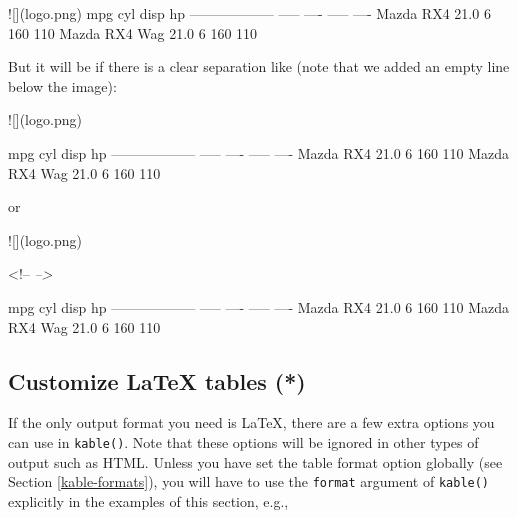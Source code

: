 \documentclass[
  11pt,
]{krantz}
\newenvironment{Shaded}{\begin{snugshade}}{\end{snugshade}}
\newcommand{\BaseNTok}[1]{\textcolor[rgb]{0.06,0.06,0.06}{#1}}
\newcommand{\CommentTok}[1]{\textcolor[rgb]{0.37,0.37,0.37}{\textit{#1}}}
\newcommand{\NormalTok}[1]{#1}
\begin{document}
\begin{Shaded}
\begin{Highlighting}[]
\NormalTok{![](logo.png)}
\BaseNTok{                      mpg   cyl   disp    hp}
\NormalTok{------------------  -----  ----  -----  ----}
\NormalTok{Mazda RX4            21.0     6    160   110}
\NormalTok{Mazda RX4 Wag        21.0     6    160   110}
\end{Highlighting}
\end{Shaded}

But it will be if there is a clear separation like (note that we added an empty line below the image):

\begin{Shaded}
\begin{Highlighting}[]
\NormalTok{![](logo.png)}

\BaseNTok{                      mpg   cyl   disp    hp}
\NormalTok{------------------  -----  ----  -----  ----}
\NormalTok{Mazda RX4            21.0     6    160   110}
\NormalTok{Mazda RX4 Wag        21.0     6    160   110}
\end{Highlighting}
\end{Shaded}

or

\begin{Shaded}
\begin{Highlighting}[]
\NormalTok{![](logo.png)}

\NormalTok{<!--}\CommentTok{ -->}

\BaseNTok{                      mpg   cyl   disp    hp}
\NormalTok{------------------  -----  ----  -----  ----}
\NormalTok{Mazda RX4            21.0     6    160   110}
\NormalTok{Mazda RX4 Wag        21.0     6    160   110}
\end{Highlighting}
\end{Shaded}

\hypertarget{customize-latex-tables}{%
\subsection{Customize LaTeX tables (*)}\label{customize-latex-tables}}

If the only output format you need is LaTeX, there are a few extra options you can use in \texttt{kable()}. Note that these options will be ignored in other types of output such as HTML. Unless you have set the table format option globally (see Section \ref{kable-formats}), you will have to use the \texttt{format} argument of \texttt{kable()} explicitly in the examples of this section, e.g.,
\end{document}
